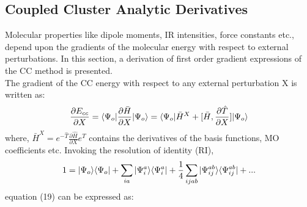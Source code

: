 \subsection{Coupled Cluster Analytic Derivatives}
Molecular properties like dipole
moments, IR intensities, force constants etc., depend upon the gradients of the
molecular energy with respect to external perturbations. 
In this section, a derivation of first order gradient expressions of the CC method is presented.\\
The gradient of the CC energy with respect to any external perturbation 
X is written as:
\begin{equation}
\frac{\partial{E_{cc}}}{\partial X} = \langle \Psi_o |\frac{\partial{\bar H}}{\partial X}| \Psi_o \rangle = \langle \Psi_o |{\bar{H}}^X + \lbrack\bar H , \frac{\partial{\hat T}}{\partial X}\rbrack| \Psi_o \rangle 
\end{equation}
where, $ {\bar{H}}^X =  e^{-\hat{T}}\frac{\partial{\hat H}}{\partial X}e^{\hat{T}}$ contains the 
derivatives of the basis functions, MO coefficients etc. Invoking the 
resolution of identity (RI),
\begin{equation}
 1 = | \Psi_o \rangle\langle \Psi_o | + \sum_{ia}| {\Psi}^a_i \rangle\langle {\Psi}^a_i | + \frac{1}{4}\sum_{ijab}| {\Psi}^{ab}_{ij} \rangle\langle {\Psi}^{ab}_{ij} | + ...
\end{equation}
equation (19) can be expressed as:
